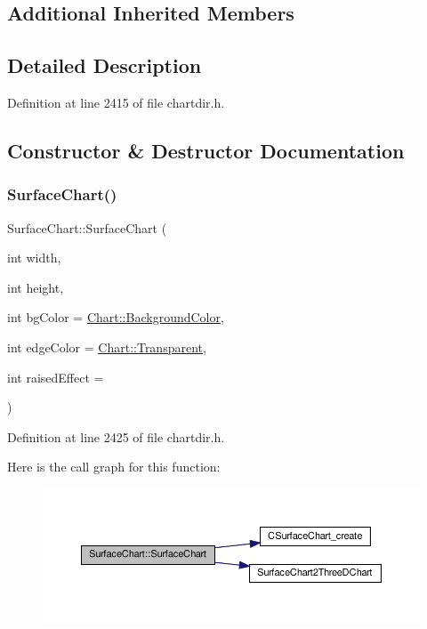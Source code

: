 \subsection*{Additional Inherited Members}


\subsection{Detailed Description}


Definition at line 2415 of file chartdir.\+h.



\subsection{Constructor \& Destructor Documentation}
\mbox{\label{class_surface_chart_aea521053e932bb67de6d982e6d50e8bc}} 
\subsubsection{\texorpdfstring{Surface\+Chart()}{SurfaceChart()}}
{\footnotesize\ttfamily Surface\+Chart\+::\+Surface\+Chart (\begin{DoxyParamCaption}\item[{int}]{width,  }\item[{int}]{height,  }\item[{int}]{bg\+Color = {\ttfamily \hyperlink{namespace_chart_abee0d882fdc9ad0b001245ad9fc64011a134193bde693b9d152d0c6dc59fa7d7f}{Chart\+::\+Background\+Color}},  }\item[{int}]{edge\+Color = {\ttfamily \hyperlink{namespace_chart_abee0d882fdc9ad0b001245ad9fc64011afc6811800a9e2582dac0157b6279f836}{Chart\+::\+Transparent}},  }\item[{int}]{raised\+Effect = {} }\end{DoxyParamCaption})\hspace{0.3cm}{\ttfamily [inline]}}



Definition at line 2425 of file chartdir.\+h.

Here is the call graph for this function\+:
\nopagebreak
\begin{figure}[H]
\begin{center}
\leavevmode
\includegraphics[width=350pt]{class_surface_chart_aea521053e932bb67de6d982e6d50e8bc_cgraph}
\end{center}
\end{figure}



